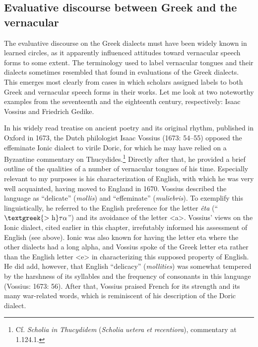 \subsection{Evaluative discourse between Greek and the vernacular}
\hypertarget{Toc19704852}{}
The evaluative discourse on the Greek dialects must have been widely known in learned circles, as it apparently influenced attitudes toward vernacular speech forms to some extent. The terminology used to label vernacular tongues and their dialects sometimes resembled that found in evaluations of the Greek dialects. This emerges most clearly from cases in which scholars assigned labels to both Greek and vernacular speech forms in their works. Let me look at two noteworthy examples from the seventeenth and the eighteenth century, respectively: Isaac Vossius and Friedrich Gedike.

In his widely read treatise on ancient poetry and its original rhythm, published in Oxford in 1673, the Dutch philologist Isaac Vossius (1673: 54–55) opposed the effeminate Ionic dialect to virile Doric, for which he may have relied on a Byzantine commentary on Thucydides.\footnote{Cf. \textit{Scholia} \textit{in} \textit{Thucydidem} (\textit{Scholia} \textit{uetera} \textit{et} \textit{recentiora}), commentary at 1.124.1.} Directly after that, he provided a brief outline of the qualities of a number of vernacular tongues of his time. Especially relevant to my purposes is his characterization of English, with which he was very well acquainted, having moved to England in 1670. Vossius described the language as “delicate” (\textit{mollis}) and “effeminate” (\textit{muliebris}). To exemplify this linguistically, he referred to the English preference for the letter \textit{êta} (“$\text{\textgreek{>~h}}\tau \alpha $”) and its avoidance of the letter <a>. Vossius’ views on the Ionic dialect, cited earlier in this chapter, irrefutably informed his assessment of English (see  above). Ionic was also known for having the letter eta where the other dialects had a long alpha, and Vossius spoke of the Greek letter eta rather than the English letter <e> in characterizing this supposed property of English. He did add, however, that English “delicacy” (\textit{mollities}) was somewhat tempered by the harshness of its syllables and the frequency of consonants in this language (Vossius: 1673: 56). After that, Vossius praised French for its strength and its many war-related words, which is reminiscent of his description of the Doric dialect.

